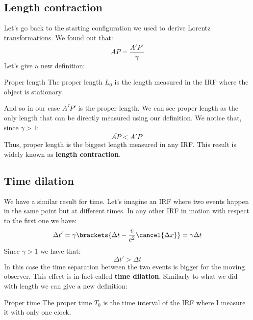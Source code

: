 \subsection{Length contraction}
Let's go back to the starting configuration we used to derive Lorentz transformations. We found out that:
\begin{equation}
  \overline{AP} = \dfrac{\overline{A'P'}}{\gamma}
\end{equation}
Let's give a new definition:
\begin{definition}{Proper length}
  The proper length $L_0$ is the length measured in the IRF where the object is stationary.
\end{definition}
And so in our case $\overline{A'P'}$ is the proper length. We can see proper length as the only length that can be directly measured using our definition. We notice that, since $\gamma >1$:
\begin{equation}
  \overline{AP} < \overline{A'P'}
\end{equation}
Thus, proper length is the biggest length measured in any IRF. This result is widely known as \textbf{length contraction}.
\subsection{Time dilation}
We have a similar result for time. Let's imagine an IRF where two events happen in the same point but at different times. In any other IRF in motion with respect to the first one we have:
\begin{equation}
  \Delta t' = \gamma\brackets{\Delta t - \dfrac{v}{c^2}\cancel{\Delta x}} = \gamma \Delta t
\end{equation}
Since $\gamma > 1$ we have that:
\begin{equation}
  \Delta t' > \Delta t
\end{equation}
In this case the time separation between the two events is bigger for the moving observer. This effect is in fact called \textbf{time dilation}. Similarly to what we did with length we can give a new definition:
\begin{definition}{Proper time}
  The proper time $T_0$ is the time interval of the IRF where I measure it with only one clock.
\end{definition}
